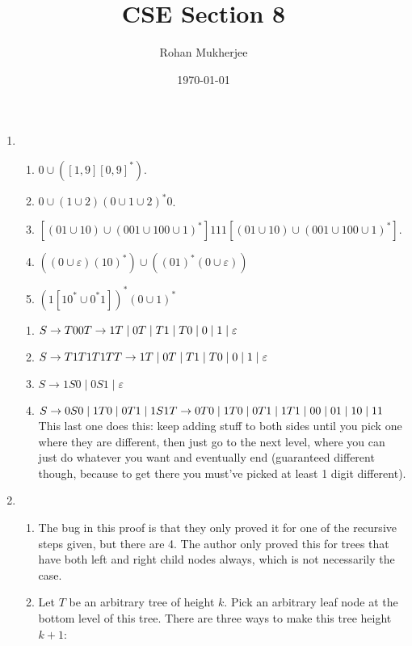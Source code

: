 \documentclass[12pt]{article}
\title{CSE Section 8}
\date{\today}
\author{Rohan Mukherjee}
\theoremstyle{definition}
\theoremstyle{remark}
\newcommand{\ve}{\varepsilon}
\newcommand\setItemnumber[1]{\setcounter{enumi}{\numexpr#1-1\relax}}
\begin{document}
	\maketitle
	\begin{enumerate}[leftmargin=\labelsep]
		\item
		\begin{enumerate}
			\item $0 \cup ([1,9][0,9]^*)$.
			\item $0 \cup (1 \cup 2)(0 \cup 1 \cup 2)^*0$.
			\item $[(01 \cup 10) \cup (001 \cup 100 \cup 1)^*]111[(01 \cup 10) \cup (001 \cup 100 \cup 1)^*]$.
			\item $((0 \cup \ve)(10)^*) \cup ((01)^*(0 \cup \ve))$
			\item $(1[1 0^* \cup 0^* 1])^*(0 \cup 1)^*$
		\end{enumerate}
	
		\begin{enumerate}
			\item 
			$S \to T00 \\
			T \to 1T \; | \; 0T \; | \; T1 \; | \; T0 \; | \; 0 \; | \; 1 \; | \; \ve $
			\item $S \to T1T1T1T \\
			T \to 1T \; | \; 0T \; | \; T1 \; | \; T0 \; | \; 0 \; | \; 1 \; | \; \ve$
			\item $S \to 1S0 \; | \; 0S1 \; | \; \ve$
			\item $S \to 0S0 \; | \; 1T0 \; | \; 0T1 \; | \; 1S1 \\
			T \to 0T0 \; | \; 1T0 \; | \; 0T1 \; | \; 1T1 \; | \; 00 \; | \; 01 \; | \; 10 \; | \; 11$ This last one does this: keep adding stuff to both sides until you pick one where they are different, then just go to the next level, where you can just do whatever you want and eventually end (guaranteed different though, because to get there you must've picked at least 1 digit different).
		\end{enumerate}
		\setItemnumber{5}
		\item
		\begin{enumerate}
			\item The bug in this proof is that they only proved it for one of the recursive steps given, but there are 4. The author only proved this for trees that have both left and right child nodes always, which is not necessarily the case.
			
			\item Let $T$ be an arbitrary tree of height $k$. Pick an arbitrary leaf node at the bottom level of this tree. There are three ways to make this tree height $k+1$:
			

\end{enumerate}
\end{enumerate}
\end{document}
